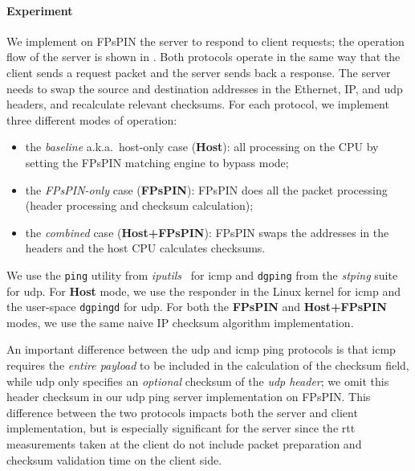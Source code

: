 \paragraph{Experiment} We implement on FPsPIN the server to respond to client requests; the operation flow of the server is shown in .  Both protocols operate in the same way that the client sends a request packet and the server sends back a response.  The server needs to swap the source and destination addresses in the Ethernet, IP, and \ac{udp} headers, and recalculate relevant checksums.  For each protocol, we implement three different modes of operation:
\begin{itemize}
    \item the \emph{baseline} a.k.a.\ host-only case (\textbf{Host}): all processing on the CPU by setting the FPsPIN matching engine to bypass mode;
    \item the \emph{FPsPIN-only} case (\textbf{FPsPIN}): FPsPIN does all the packet processing (header processing and checksum calculation);
    \item the \emph{combined} case (\textbf{Host+FPsPIN}): FPsPIN swaps the addresses in the headers and the host CPU calculates checksums.
\end{itemize}
We use the \texttt{ping} utility from \emph{iputils}~\cite{noauthor_iputilsiputils_2023} for \ac{icmp} and \texttt{dgping} from the \emph{stping} suite~\cite{katherine_stpingdgping_2023} for \ac{udp}.  For \textbf{Host} mode, we use the responder in the Linux kernel for \ac{icmp} and the user-space \texttt{dgpingd} for \ac{udp}.  For both the \textbf{FPsPIN} and \textbf{Host+FPsPIN} modes, we use the same naive IP checksum algorithm implementation.

An important difference between the \ac{udp} and \ac{icmp} ping protocols is that \ac{icmp} requires the \emph{entire payload} to be included in the calculation of the checksum field, while \ac{udp} only specifies an \emph{optional} checksum of the \emph{\ac{udp} header}; we omit this header checksum in our \ac{udp} ping server implementation on FPsPIN.  This difference between the two protocols impacts both the server and client implementation, but is especially significant for the server since the \ac{rtt} measurements taken at the client do not include packet preparation and checksum validation time on the client side.

